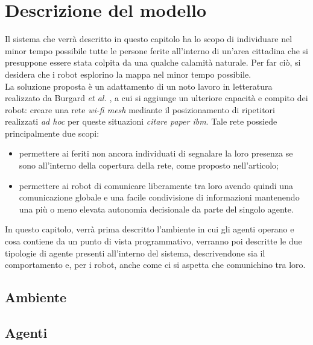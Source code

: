 \chapter{Descrizione del modello}
\label{chap:modeldesc}
Il sistema che verrà descritto in questo capitolo ha lo scopo di individuare nel minor tempo possibile tutte le persone ferite all'interno di un'area cittadina che si presuppone essere stata colpita da una qualche calamità naturale.
Per far ciò, si desidera che i robot esplorino la mappa nel minor tempo possibile.\\
La soluzione proposta è un adattamento di un noto lavoro in letteratura realizzato da Burgard \textit{et al.} \cite{burgard2005}, a cui si aggiunge un ulteriore capacità e compito dei robot: creare una rete \textit{wi-fi mesh} mediante il posizionamento di ripetitori realizzati \textit{ad hoc} per queste situazioni \textit{citare paper ibm}.
Tale rete possiede principalmente due scopi: \begin{itemize}
	\item permettere ai feriti non ancora individuati di segnalare la loro presenza se sono all'interno della copertura della rete, come proposto nell'articolo;
	\item permettere ai robot di comunicare liberamente tra loro avendo quindi una comunicazione globale e una facile condivisione di informazioni mantenendo una più o meno elevata autonomia decisionale da parte del singolo agente.
\end{itemize} 
In questo capitolo, verrà prima descritto l'ambiente in cui gli agenti operano e cosa contiene da un punto di vista programmativo, verranno poi descritte le due tipologie di agente presenti all'interno del sistema, descrivendone sia il comportamento e, per i robot, anche come ci si aspetta che comunichino tra loro.
\section{Ambiente}
\label{sec:environment}

\section{Agenti}
\label{sec:agents}
